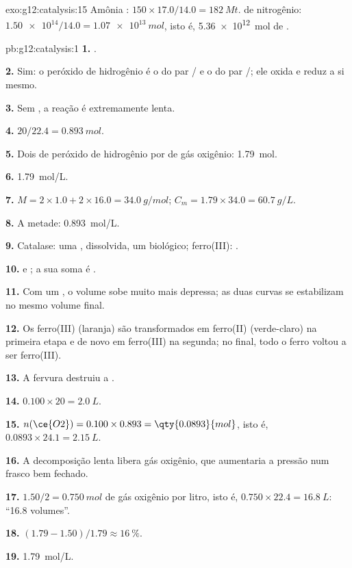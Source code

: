 \begin{solution}{exo:g12:catalysis:15}
Amônia : $150 \times 17.0 / 14.0 = \qty{182}{Mt}$.  de
nitrogênio: $\num{1.50e14} / 14.0 = \qty{1.07e13}{mol}$, isto é,
\qty{5.36e12}{mol} de .
\end{solution}

\begin{solution}{pb:g12:catalysis:1}
\textbf{1.} .

\textbf{2.} Sim: o peróxido de hidrogênio é o  do par
/ e o  do par /; ele oxida e
reduz a si mesmo.

\textbf{3.} Sem , a reação é extremamente lenta.

\textbf{4.} $20 / 22.4 = \qty{0.893}{mol}$.

\textbf{5.} Dois  de peróxido de hidrogênio por  de gás
oxigênio: \qty{1.79}{mol}.

\textbf{6.} \qty{1.79}{mol/L}.

\textbf{7.} $M = 2 \times 1.0 + 2 \times 16.0 = \qty{34.0}{g/mol}$;
$C_m = 1.79 \times 34.0 = \qty{60.7}{g/L}$.

\textbf{8.} A metade: \qty{0.893}{mol/L}.

\textbf{9.} Catalase: uma , dissolvida, um  biológico;
 ferro(III): .

\textbf{10.}  e
; a sua soma é
.

\textbf{11.} Com um , o volume sobe muito mais depressa; as
duas curvas se estabilizam no mesmo volume final.

\textbf{12.} Os  ferro(III) (laranja) são transformados em ferro(II)
(verde-claro) na primeira etapa e de novo em ferro(III) na segunda; no
final, todo o ferro voltou a ser ferro(III).

\textbf{13.} A fervura destruiu a .

\textbf{14.} $0.100 \times 20 = \qty{2.0}{L}$.

\textbf{15.} $n(\ce{O2}) = 0.100 \times 0.893 = \qty{0.0893}{mol}$, isto
é, $0.0893 \times 24.1 = \qty{2.15}{L}$.

\textbf{16.} A decomposição lenta libera gás oxigênio, que aumentaria a
pressão num frasco bem fechado.

\textbf{17.} $1.50 / 2 = \qty{0.750}{mol}$ de gás oxigênio por litro,
isto é, $0.750 \times 22.4 = \qty{16.8}{L}$: ``16.8 volumes''.

\textbf{18.} $(1.79 - 1.50)/1.79 \approx \qty{16}{\percent}$.

\textbf{19.} \qty{1.79}{mol/L}.
\end{solution}
